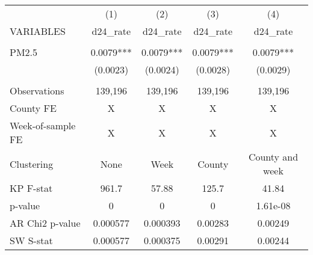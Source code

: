 \begin{tabular}{lcccc} \hline
 & (1) & (2) & (3) & (4) \\
VARIABLES & d24\_rate & d24\_rate & d24\_rate & d24\_rate \\ \hline
 &  &  &  &  \\
PM2.5 & 0.0079*** & 0.0079*** & 0.0079*** & 0.0079*** \\
 & (0.0023) & (0.0024) & (0.0028) & (0.0029) \\
 &  &  &  &  \\
Observations & 139,196 & 139,196 & 139,196 & 139,196 \\
County FE & X & X & X & X \\
Week-of-sample FE & X & X & X & X \\
Clustering & None & Week & County & County and week \\
KP F-stat & 961.7 & 57.88 & 125.7 & 41.84 \\
p-value & 0 & 0 & 0 & 1.61e-08 \\
AR Chi2 p-value & 0.000577 & 0.000393 & 0.00283 & 0.00249 \\
 SW S-stat & 0.000577 & 0.000375 & 0.00291 & 0.00244 \\ \hline
\end{tabular}
